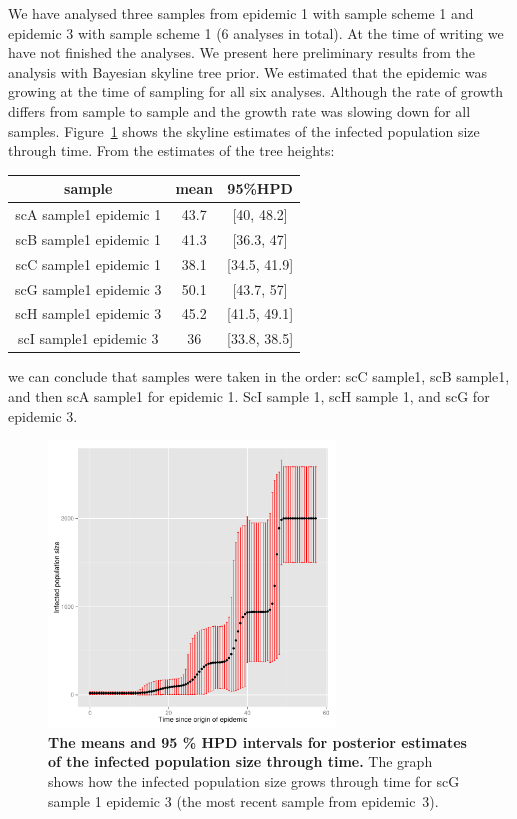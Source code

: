 \documentclass[11pt]{article}
\begin{document}
We have analysed three samples from epidemic 1 with sample scheme 1 and epidemic 3 with sample scheme 1 (6 analyses in total). At the time of writing we have not finished the analyses. We present here preliminary results from the analysis with Bayesian skyline tree prior. We estimated that the epidemic was growing at the time of sampling for all six analyses. Although the rate of growth differs from sample to sample and the growth rate was slowing down for all samples. Figure~\ref{fig: popSize} shows the skyline estimates of the infected population size through time.  From the estimates of the tree heights:

\vskip2mm

\begin{tabular} {ccc}
sample & mean & 95\%HPD \\
\hline
scA sample1 epidemic 1 & 43.7 & [40, 48.2] \\
scB sample1 epidemic 1 & 41.3 & [36.3, 47] \\
scC sample1 epidemic 1 & 38.1 & [34.5, 41.9] \\
scG sample1 epidemic 3 & 50.1 & [43.7, 57] \\
scH sample1 epidemic 3 & 45.2 & [41.5, 49.1] \\
scI sample1 epidemic 3 & 36 & [33.8, 38.5]  \\
\end{tabular}

\vskip2mm

\noindent we can conclude that samples were taken in the order: scC sample1, scB sample1, and then scA sample1 for epidemic 1. ScI sample 1, scH sample 1, and  scG for epidemic 3. 

\begin{center} 
\begin{figure}[!h]
\includegraphics[width=3in]{popSize}
\caption{\footnotesize {\bf The means and 95 \% HPD intervals for posterior estimates of the infected population size through time.} 
The graph shows how the infected population size  grows through time for scG sample 1 epidemic 3 (the most recent sample from epidemic~3).} 
\label{fig: popSize} 
\end{figure}
\end{center} 
\end{document}
